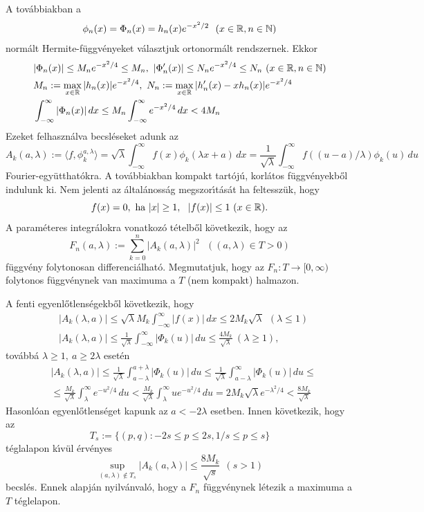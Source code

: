 \documentclass[oneside,titlepage,12pt,a4paper]{report}
\begin{document}
 A tov\'abbiakban a
 $$
 \phi_n(x)=\Phi_n(x)=h_n(x)e^{-x^2/2}\ \ (x\in\Bbb R, n\in\Bbb N)
 $$
 norm\'alt Hermite-f\"uggv\'enyeket v\'alasztjuk ortonorm\'alt rendszernek. Ekkor
 \begin{equation}
 \begin{split}
 &|\Phi_n(x)|\le M_n e^{-x^2/4}\le M_n, \ |\Phi_n'(x)|\le N_n e^{-x^2/4}\le N_n\ (x\in\Bbb R, n\in\Bbb N)\\
 &M_n:=\max_{x\in\Bbb R}|h_n(x)|e^{-x^2/4},\ N_n:=\max_{x\in\Bbb R}|h'_n(x)-xh_n(x)|e^{-x^2/4}\\
 &\int_{-\infty}^\infty|\Phi_n(x)|\, dx\le M_n\int_{-\infty}^\infty e^{-x^2/4}\, dx<4M_n
 \end{split}
 \end{equation}
 Ezeket felhaszn\'alva becsl\'eseket adunk az
 $$
 A_k(a,\lambda):=\langle f,\phi_k^{a,\lambda}\rangle=\sqrt{\lambda}\int_{-\infty}^\infty f(x)\phi_k(\lambda x+a)\, dx=\frac 1{\sqrt{\lambda}}\int_{-\infty}^\infty f((u-a)/\lambda)\phi_k(u)\, du
 $$
 Fourier-egy\"utthat\'okra. A tov\'abbiakban kompakt tart\'oj\'u, korl\'atos f\"uggv\'enyekb\H ol indulunk ki. Nem jelenti az \'altal\'anoss\'ag megszor\'\i t\'as\'at ha  feltessz\"uk, hogy
 $$
 f(x)=0,\ \text{ha}\ |x|\ge 1,\ \ |f(x)|\le 1 \ (x\in\Bbb R).
 $$
 A param\'eteres integr\'alokra vonatkoz\'o t\'etelb\H ol  k\"ovetkezik, hogy   az
 $$
 F_n(a,\lambda):=\sum_{k=0}^n|A_k(a,\lambda)|^2\ \ \  ((a,\lambda)\in T>0)
 $$
 f\"uggv\'eny folytonosan  differenci\'alhat\'o. Megmutatjuk, hogy az $F_n:T\to [0,\infty)$
 folytonos f\"uggv\'enynek van maximuma a $T$ (nem kompakt) halmazon.

 A fenti egyenl\H otlens\'egekb\H ol k\"ovetkezik, hogy
 \begin{equation}
 \begin{split}
 &|A_k(\lambda,a)|\le \sqrt{\lambda} M_k\int_{-\infty}^\infty |f(x)|\, dx\le 2M_k\sqrt{\lambda}\ \ (\lambda\le 1)\\
 &|A_k(\lambda,a)|\le\frac 1{\sqrt{\lambda}}\int_{-\infty}^\infty |\Phi_k(u)|\, du\le
 \frac {4M_k}{\sqrt{\lambda}}\ (\lambda\ge 1),
 \end{split}
 \end{equation}
 tov\'abb\'a $\lambda\ge 1,\ a\ge 2\lambda $ eset\'en
 \begin{equation}
 \begin{split}
 &|A_k(\lambda,a)|\le \frac 1{\sqrt{\lambda}}\int_{a-\lambda}^{a+\lambda}|\Phi_k(u)|\, du
 \le \frac 1{\sqrt{\lambda}}\int_{a-\lambda}^\infty |\Phi_k(u)|\, du\le\\
 &\le \frac {M_k}{\sqrt{\lambda}}\int_\lambda^\infty e^{-{u^2}/4}\, du<
 \frac {M_k}{\sqrt{\lambda}}\int_\lambda^\infty u e^{-{u^2}/4}\, du=
 2 M_k\sqrt{\lambda} e^{-{\lambda^2}/4}<\frac {8M_k}{\sqrt{\lambda}}
\end{split}
\end{equation}
Hasonl\'oan egyenl\H otlens\'eget kapunk az $a<-2\lambda$ esetben. Innen k\"ovetkezik, hogy az
$$
T_s:=\{(p,q): -2s\le p\le 2s, 1/s\leq p \le s\}
$$
t\'eglalapon k\'\i v\"ul  \'erv\'enyes
$$
\sup_{(a,\lambda) \notin T_s}|A_k(a,\lambda)|\le \frac {8M_k}{\sqrt s}\ \  (s>1)
$$
becsl\'es. Ennek alapj\'an nyilv\'anval\'o, hogy a $F_n$  f\"uggv\'enynek l\'etezik a maximuma a $T$ t\'eglelapon.
\end{document}
